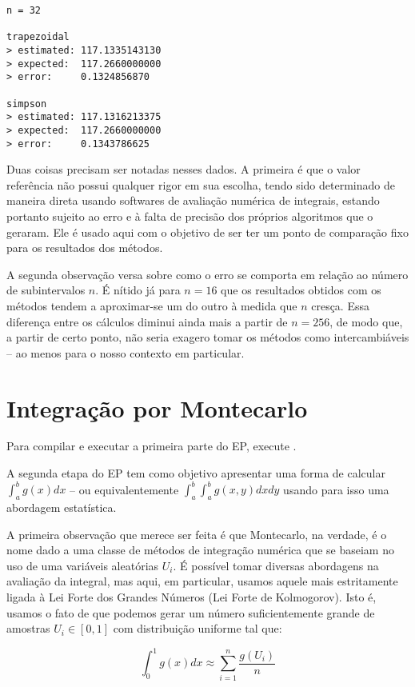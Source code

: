 \documentclass[11pt,reqno,a4paper]{amsart}
\newcommand{\code}[1]{\colorbox{light-gray}{\textcolor{dark-gray}{\fontsize{10}{10}{\texttt{#1}}}}}
\begin{document}
\begin{verbatim}
n = 32

trapezoidal
> estimated: 117.1335143130
> expected:  117.2660000000
> error:     0.1324856870

simpson
> estimated: 117.1316213375
> expected:  117.2660000000
> error:     0.1343786625
\end{verbatim}

\bigskip
Duas coisas precisam ser notadas nesses dados. A primeira é que o valor referência não possui qualquer rigor em sua escolha, tendo sido determinado de maneira direta usando softwares de avaliação numérica de integrais, estando portanto sujeito ao erro e à falta de precisão dos próprios algoritmos que o geraram. Ele é usado aqui com o objetivo de ser ter um ponto de comparação fixo para os resultados dos métodos.

\bigskip
A segunda observação versa sobre como o erro se comporta em relação ao número de subintervalos $n$. É nítido já para $n=16$ que os resultados obtidos com os métodos tendem a aproximar-se um do outro à medida que $n$ cresça. Essa diferença entre os cálculos diminui ainda mais a partir de $n=256$, de modo que, a partir de certo ponto, não seria exagero tomar os métodos como intercambiáveis – ao menos para o nosso contexto em particular.

\newpage
\section{Integração por Montecarlo}

\medskip
Para compilar e executar a primeira parte do EP, execute \code{make part\_2 \&\& ./part\_2.o}.

\bigskip
A segunda etapa do EP tem como objetivo apresentar uma forma de calcular $\int_a^b g(x) dx$ – ou equivalentemente $\int_a^b \int_a^b g(x,y) dxdy$ usando para isso uma abordagem estatística.

\bigskip
A primeira observação que merece ser feita é que Montecarlo, na verdade, é o nome dado a uma classe de métodos de integração numérica que se baseiam no uso de uma variáveis aleatórias $U_i$. É possível tomar diversas abordagens na avaliação da integral, mas aqui, em particular, usamos aquele mais estritamente ligada à Lei Forte dos Grandes Números (Lei Forte de Kolmogorov). Isto é, usamos o fato de que podemos gerar um número suficientemente grande de amostras $U_i \in [0,1]$ com distribuição uniforme tal que:

\begin{equation}
    \int_0^1 g(x) dx \approx \sum_{i=1}^n \frac{g(U_i)}{n}
\end{equation}
\end{document}
